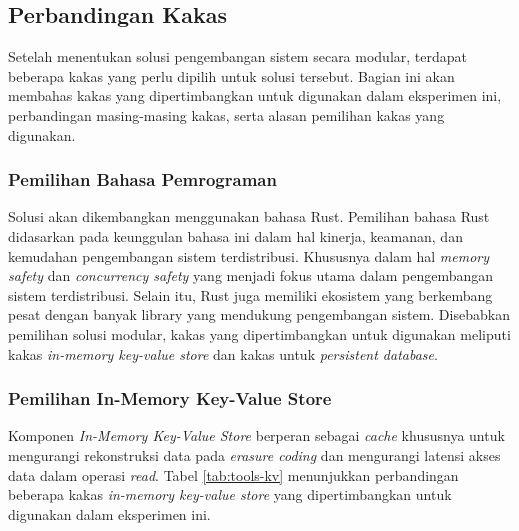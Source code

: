 \subsection{Perbandingan Kakas}
\label{subsection:perbandingan-kakas}

Setelah menentukan solusi pengembangan sistem secara modular, terdapat beberapa kakas yang perlu dipilih untuk solusi tersebut. Bagian ini akan membahas kakas yang dipertimbangkan untuk digunakan dalam eksperimen ini, perbandingan masing-masing kakas, serta alasan pemilihan kakas yang digunakan.

\subsubsection{Pemilihan Bahasa Pemrograman}
\label{subsubsection:pilihan-bahasa-pemrograman}

Solusi akan dikembangkan menggunakan bahasa Rust. Pemilihan bahasa Rust didasarkan pada keunggulan bahasa ini dalam hal kinerja, keamanan, dan kemudahan pengembangan sistem terdistribusi. Khususnya dalam hal \textit{memory safety} dan \textit{concurrency safety} yang menjadi fokus utama dalam pengembangan sistem terdistribusi. Selain itu, Rust juga memiliki ekosistem yang berkembang pesat dengan banyak library yang mendukung pengembangan sistem. Disebabkan pemilihan solusi modular, kakas yang dipertimbangkan untuk digunakan meliputi kakas \textit{in-memory key-value store} dan kakas untuk \textit{persistent database}.

\subsubsection{Pemilihan In-Memory Key-Value Store}
\label{subsubsection:in-memory-kv-store}

Komponen \textit{In-Memory Key-Value Store} berperan sebagai \textit{cache} khususnya untuk mengurangi rekonstruksi data pada \textit{erasure coding} dan mengurangi latensi akses data dalam operasi \textit{read}. Tabel \ref{tab:tools-kv} menunjukkan perbandingan beberapa kakas \textit{in-memory key-value store} yang dipertimbangkan untuk digunakan dalam eksperimen ini.

